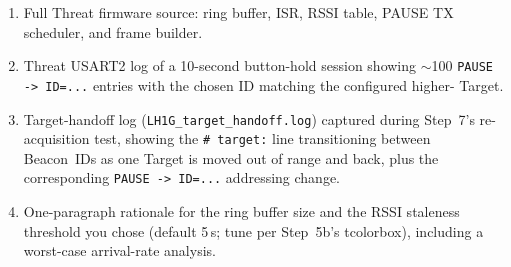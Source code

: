 \documentclass[11pt,letterpaper]{article}
\begin{document}
\begin{tcolorbox}[deliverable={Lab Handout 1-G Deliverable}]
	\begin{enumerate}[leftmargin=1.2em]
		\item Full Threat firmware source: ring buffer, ISR, RSSI table, PAUSE TX scheduler, and frame builder.
		\item Threat USART2 log of a 10-second button-hold session showing $\sim$100 \texttt{PAUSE -> ID=...} entries with the chosen ID matching the configured higher-\RSSI{} Target.
		\item Target-handoff log (\texttt{LH1G\_target\_handoff.log}) captured during Step~7's re-acquisition test, showing the \texttt{\#~target:} line transitioning between Beacon~IDs as one Target is moved out of range and back, plus the corresponding \texttt{PAUSE -> ID=...} addressing change.
		\item One-paragraph rationale for the ring buffer size and the RSSI staleness threshold you chose (default 5\,s; tune per Step~5b's tcolorbox), including a worst-case arrival-rate analysis.
	\end{enumerate}
\end{tcolorbox}

\printhandoutglossary
\end{document}
